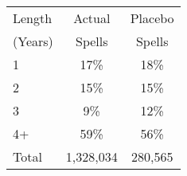 \begin{tabular}{lcc}
\toprule
Length & Actual & Placebo \\
(Years) & Spells & Spells \\
\midrule
1 & 17\% & 18\% \\
2 & 15\% & 15\% \\
3 & 9\% & 12\% \\
4+ & 59\% & 56\% \\
Total &    1,328,034 &      280,565 \\
\bottomrule
\end{tabular}
